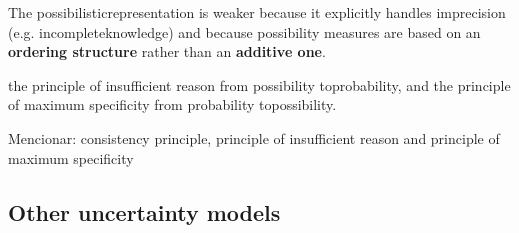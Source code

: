{The possibilisticrepresentation is weaker because it explicitly handles imprecision (e.g. incompleteknowledge) and because possibility measures are based on an \textbf{ordering structure} rather than an \textbf{additive one}.

the principle of insufficient reason from possibility toprobability, and the principle of maximum specificity from probability topossibility.

Mencionar: consistency principle, principle of insufficient reason and principle of maximum specificity
}


\subsection{Other uncertainty models}




